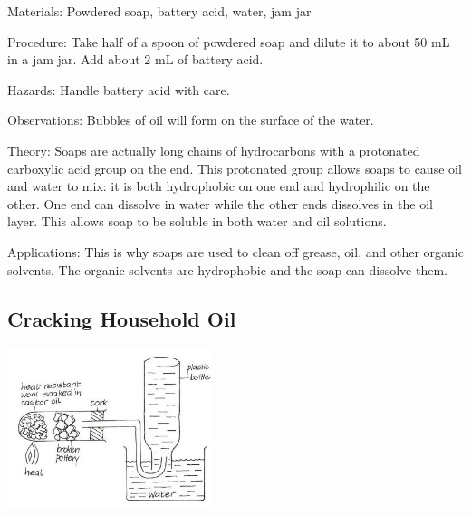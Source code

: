 \begin{multicols}{2}
\begin{description*}
\item[Materials:]{Powdered soap, battery acid, water, jam jar}
\item[Procedure:]{Take half of a spoon of powdered soap and dilute it to about 50 mL in a jam jar. Add about 2 mL of battery acid.}
\item[Hazards:]{Handle battery acid with care.}
\item[Observations:]{Bubbles of oil will form on the surface of the water.}
\item[Theory:]{Soaps are actually long chains of hydrocarbons with a protonated carboxylic acid group on the end. This protonated group allows soaps to cause oil and water to mix: it is both hydrophobic on one end and hydrophilic on the other. One end can dissolve in water while the other ends dissolves in the oil layer. This allows soap to be soluble in both water and oil solutions.}
\item[Applications:]{This is why soaps are used to clean off grease, oil, and other organic solvents. The organic solvents are hydrophobic and the soap can dissolve them.}
\end{description*}

\subsection{Cracking Household Oil}

\begin{center}
\includegraphics[width=0.45\textwidth]{./img/vso/cracking.jpg}
\end{center}


\end{multicols}
